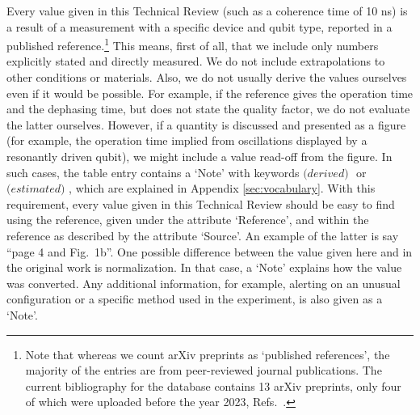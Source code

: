 \documentclass[aps, prx, showpacs, twocolumn, superscriptaddress, notitlepage, longbibliography, floatfix, nofootinbib]{revtex4-2}
\newcommand{\estimated}{\textit{(estimated) }}
\newcommand{\derived}{\textit{(derived) }}
\newcommand{\myKey}[1]{$\whitearrowupfrombar$\textit{#1}}
\renewcommand{\myKey}[1]{\textit{#1}}
\renewcommand{\myKey}[1]{`{#1}'}
\newcommand{\recheck}[1]{{#1}}
\begin{document}
Every value given in this Technical Review (such as a coherence time of 10 ns) is a result of a measurement with a specific device and qubit type, reported in a published reference.\footnote{\recheck{Note that whereas we count arXiv preprints as `published references', the majority of the entries are from peer-reviewed journal publications. The current bibliography for the database contains 13 arXiv preprints, only four of which were uploaded before the year 2023, Refs.~\cite{hayes_lifetime_2009,cerfontaine_feedback-tuned_2016,ruffino_integrated_2021,geyer_two-qubit_2022}.}} This means, first of all, that we include only numbers explicitly stated and directly measured. We do not include extrapolations to other conditions or materials. Also, we do not usually derive the values ourselves even if it would be possible. For example, if the reference gives the operation time and the dephasing time, but does not state the quality factor, we do not evaluate the latter ourselves. However, if a quantity is discussed and presented as a figure (for example, the operation time implied from oscillations displayed by a resonantly driven qubit), we might include a value read-off from the figure. In such cases, the table entry contains a \myKey{Note} with keywords $\derived$\! or $\estimated$\!, which are explained in Appendix \ref{sec:vocabulary}. With this requirement, every value given in this Technical Review should be easy to find using the reference, given under the attribute \myKey{Reference}, and within the reference as described by the attribute \myKey{Source}. An example of the latter is say ``page 4 and Fig.~1b''. One possible difference between the value given here and in the original work is normalization. In that case, a \myKey{Note} explains how the value was converted. Any additional information, for example, alerting on an unusual configuration or a specific method used in the experiment, is also given as a \myKey{Note}. 
\end{document}
